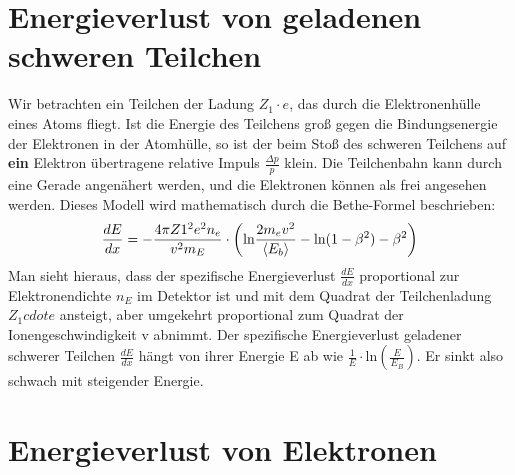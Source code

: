 \documentclass[Ex4_Zusammenfassung.tex]{subfiles}
\begin{document}
\section{Energieverlust von geladenen schweren Teilchen}
Wir betrachten ein Teilchen der Ladung $Z_1 \cdot e $, das durch die Elektronenhülle eines Atoms fliegt. Ist die Energie des Teilchens groß gegen die Bindungsenergie der Elektronen in der Atomhülle, so ist der beim Stoß des schweren Teilchens auf \textbf{ein} Elektron  übertragene relative Impuls $\frac{\Delta p}{p}$ klein. Die Teilchenbahn kann durch eine Gerade angenähert werden, und die Elektronen können als frei angesehen werden.
Dieses Modell wird mathematisch durch die Bethe-Formel beschrieben:
\begin{equation}
\frac{dE}{dx} = - \frac{4 \pi Z1^2 e^2 n_e}{v^2 m_E} \cdot \left( \text{ln} \frac{2 m_e v^2}{\braket{E_b}} - \text{ln}(1-\beta^2) - \beta^2 \right )
\end{equation}
Man sieht hieraus, dass der spezifische Energieverlust $\frac{dE}{dx}$ proportional zur Elektronendichte $n_E$ im Detektor ist und mit dem Quadrat der Teilchenladung $Z_1 cdot e$ ansteigt, aber umgekehrt proportional zum Quadrat der Ionengeschwindigkeit v abnimmt. Der spezifische Energieverlust geladener schwerer Teilchen $\frac{dE}{dx} $ hängt von ihrer Energie E ab wie $ \frac{1}{E} \cdot \text{ln} (\frac{E}{E_B}) $. Er sinkt also schwach mit steigender Energie.
\newpage
\section{Energieverlust von Elektronen}
\end{document}
